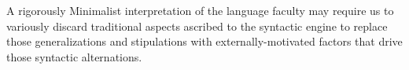\documentclass{article}
\begin{document}




A rigorously Minimalist interpretation of the language faculty may require us to variously discard traditional aspects ascribed to the syntactic engine to
replace those generalizations and stipulations with externally-motivated factors that drive those syntactic alternations.
\end{document}
